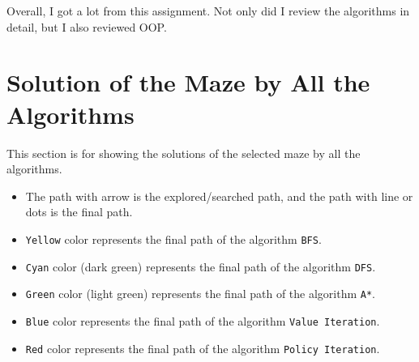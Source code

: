 \documentclass{article}
\begin{document}
Overall, I got a lot from this assignment. Not only did I review the algorithms in detail, but I also reviewed OOP.

\section{Solution of the Maze by All the Algorithms}
This section is for showing the solutions of the selected maze by all the algorithms.

\begin{itemize}
    \item The path with arrow is the explored/searched path, and the path with line or dots is the final path.
    \item \texttt{Yellow} color represents the final path of the algorithm \texttt{BFS}.
    \item \texttt{Cyan} color (dark green) represents the final path of the algorithm \texttt{DFS}.
    \item \texttt{Green} color (light green) represents the final path of the algorithm \texttt{A*}.
    \item \texttt{Blue} color represents the final path of the algorithm \texttt{Value Iteration}.
    \item \texttt{Red} color represents the final path of the algorithm \texttt{Policy Iteration}.
\end{itemize}
\end{document}
